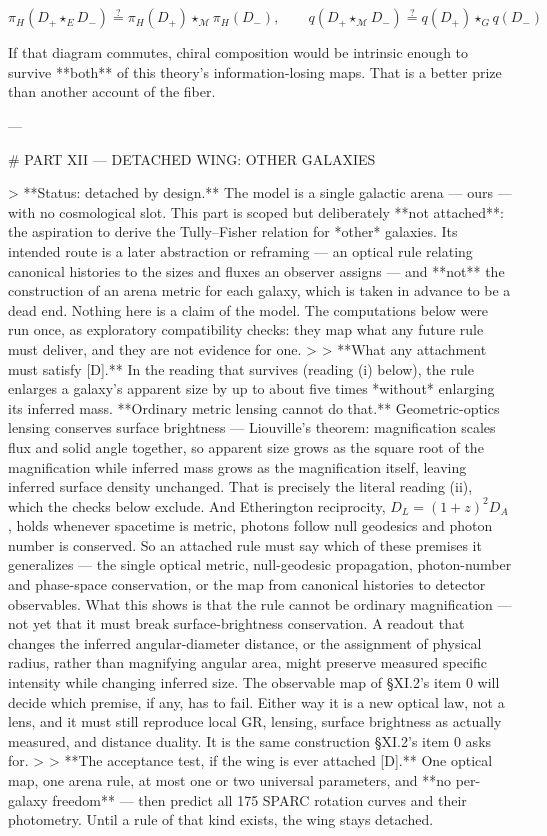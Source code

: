 $$\pi_H(D_+\star_E D_-) \overset{?}{=} \pi_H(D_+)\star_\mathcal{M}\pi_H(D_-),\qquad q(D_+\star_\mathcal{M}D_-)\overset{?}{=} q(D_+)\star_G q(D_-)$$

If that diagram commutes, chiral composition would be intrinsic enough to survive **both** of this theory's information-losing maps. That is a better prize than another account of the fiber.

---

# PART XII — DETACHED WING: OTHER GALAXIES

> **Status: detached by design.** The model is a single galactic arena — ours — with no cosmological slot. This part is scoped but deliberately **not attached**: the aspiration to derive the Tully–Fisher relation for *other* galaxies. Its intended route is a later abstraction or reframing — an optical rule relating canonical histories to the sizes and fluxes an observer assigns — and **not** the construction of an arena metric for each galaxy, which is taken in advance to be a dead end. Nothing here is a claim of the model. The computations below were run once, as exploratory compatibility checks: they map what any future rule must deliver, and they are not evidence for one.
>
> **What any attachment must satisfy [D].** In the reading that survives (reading (i) below), the rule enlarges a galaxy's apparent size by up to about five times *without* enlarging its inferred mass. **Ordinary metric lensing cannot do that.** Geometric-optics lensing conserves surface brightness — Liouville's theorem: magnification scales flux and solid angle together, so apparent size grows as the square root of the magnification while inferred mass grows as the magnification itself, leaving inferred surface density unchanged. That is precisely the literal reading (ii), which the checks below exclude. And Etherington reciprocity, $D_L = (1+z)^2D_A$, holds whenever spacetime is metric, photons follow null geodesics and photon number is conserved. So an attached rule must say which of these premises it generalizes — the single optical metric, null-geodesic propagation, photon-number and phase-space conservation, or the map from canonical histories to detector observables. What this shows is that the rule cannot be ordinary magnification — not yet that it must break surface-brightness conservation. A readout that changes the inferred angular-diameter distance, or the assignment of physical radius, rather than magnifying angular area, might preserve measured specific intensity while changing inferred size. The observable map of §XI.2's item 0 will decide which premise, if any, has to fail. Either way it is a new optical law, not a lens, and it must still reproduce local GR, lensing, surface brightness as actually measured, and distance duality. It is the same construction §XI.2's item 0 asks for.
>
> **The acceptance test, if the wing is ever attached [D].** One optical map, one arena rule, at most one or two universal parameters, and **no per-galaxy freedom** — then predict all 175 SPARC rotation curves and their photometry. Until a rule of that kind exists, the wing stays detached.

